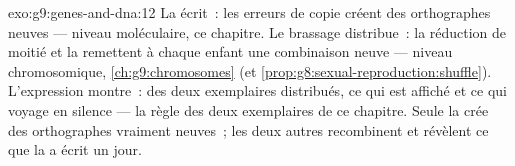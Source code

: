 \begin{solution}{exo:g9:genes-and-dna:12}
La  écrit~: les erreurs de copie créent des
orthographes neuves --- niveau moléculaire, ce chapitre. Le
brassage distribue~: la réduction de moitié et la
 remettent à chaque enfant une combinaison neuve
--- niveau chromosomique, \cref{ch:g9:chromosomes} (et
\cref{prop:g8:sexual-reproduction:shuffle}). L'expression
montre~: des deux exemplaires distribués, ce qui est affiché
et ce qui voyage en silence --- la règle des deux
exemplaires de ce chapitre. Seule la  crée des
orthographes vraiment neuves~; les deux autres recombinent
et révèlent ce que la  a écrit un jour.
\end{solution}

